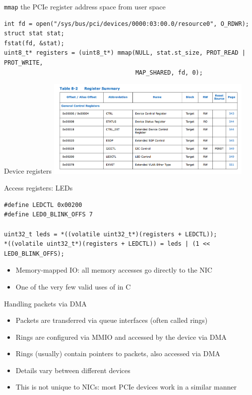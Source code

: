 \documentclass[NET,english,aspectratio=169,notitleframe]{tumbeamer}
\begin{document}
\begin{frame}[fragile=singleslide]{\texttt{mmap} the PCIe register address space from user space}
\begin{verbatim}
int fd = open("/sys/bus/pci/devices/0000:03:00.0/resource0", O_RDWR);
struct stat stat;
fstat(fd, &stat);
uint8_t* registers = (uint8_t*) mmap(NULL, stat.st_size, PROT_READ | PROT_WRITE,
                                     MAP_SHARED, fd, 0);
\end{verbatim}
\end{frame}

\begin{frame}{Device registers}
\centering\includegraphics[width=0.75\textwidth]{pics/registers}
\end{frame}

\begin{frame}[fragile=singleslide]{Access registers: LEDs}
\begin{verbatim}
#define LEDCTL 0x00200
#define LED0_BLINK_OFFS 7

uint32_t leds = *((volatile uint32_t*)(registers + LEDCTL));
*((volatile uint32_t*)(registers + LEDCTL)) = leds | (1 << LED0_BLINK_OFFS);
\end{verbatim}
\begin{itemize}
\item Memory-mapped IO: all memory accesses go directly to the NIC
\item One of the very few valid uses of  in C
\end{itemize}
\end{frame}


\begin{frame}{Handling packets via DMA}
\begin{itemize}
\item Packets are transferred via queue interfaces (often called rings)
\item Rings are configured via MMIO and accessed by the device via DMA
\item Rings (usually) contain pointers to packets, also accessed via DMA
\pause
\vspace{1em}
\item Details vary between different devices
\item This is not unique to NICs: most PCIe devices work in a similar manner
\end{itemize}
\end{frame}
\end{document}
